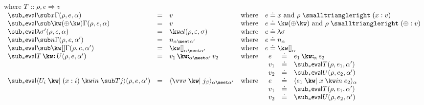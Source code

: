 \begin{figure}[H]
\flushleft
{}
where $T :: \rho, e \mathrel{\Rightarrow} v$ \\
\small
\vspace{3mm}
$\begin{array}{lllll}
\evalFwdF{\trVar{x}{\Gamma}}(\rho,e,\alpha)
&=&
v
&\text{where}&
e \eq \exVar{x}
\text{ and }
\envLookup{\rho}{x}{v}
\\
\evalFwdF{\trOp{\primOp}{\Gamma}}(\rho,e,\alpha)
&=&
v
&\text{where}&
e \eq \exOp{\primOp}
\text{ and }
\envLookup{\rho}{\primOp}{v}
\\
\evalFwdF{\trLambda{\sigma'}}(\rho,e,\alpha)
&=&
\exClosure{\rho}{\seqEmpty}{\sigma}
&\text{where}&
e \eq \exLambda{\sigma}
\\
\evalFwdF{\trInt{n}{\Gamma}}(\rho,e,\alpha')
&=&
\annInt{n}{\alpha \meet \alpha'}
&\text{where}&
e \eq \annInt{n}{\alpha}
\\
\evalFwdF{\trNil{\Gamma}}(\rho,e,\alpha')
&=&
\annNil{\alpha \meet \alpha'}
&\text{where}&
e \eq \annNil{\alpha}
\\
\evalFwdF{\trCons{T}{U}}(\rho,e,\alpha')
&=&
\annCons{v_1}{v_2}{\alpha \meet \alpha'}
&\text{where}&
\begin{array}[t]{lll}
   e &\eq& \annCons{e_1}{e_2}{\alpha}
   \\
   v_1 &\eq& \evalFwdF{T}(\rho, e_1, \alpha')
   \\
   v_2 &\eq& \evalFwdF{U}(\rho, e_2, \alpha')
\end{array}
\\
\evalFwdF{\trVec{U_{i}}{x}{i}{T}{j}}(\rho,e,\alpha')
&=&
\annVecVal{\vec{v}}{\annInt{j}{\beta}}{\alpha \meet \alpha'}
&\text{where}&
\begin{array}[t]{lll}
   e &\eq& \annVec{e_1}{x}{e_2}{\alpha}
   \\
   v_1 &\eq& \evalFwdF{T}(\rho, e_1, \alpha')
   \\
   v_2 &\eq& \evalFwdF{U}(\rho, e_2, \alpha')
\end{array}
\end{array}$\\
\vspace{3mm}


\end{figure}
